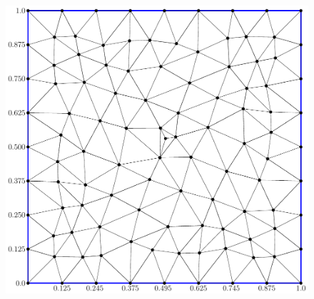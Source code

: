 \documentclass{beamer}
\begin{document}
\begin{frame}
\begin{figure}
\begin{minipage}[t]{.49\textwidth}
      \includegraphics[height=0.95\linewidth]{figure/unstructured_mesh.pdf}
    \end{minipage}
  \end{figure}
\end{frame}

\end{document}
